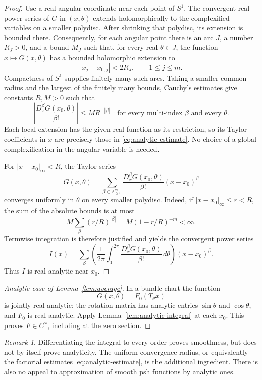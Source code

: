 \documentclass[11pt]{amsart}
\theoremstyle{definition}
\theoremstyle{remark}
\newtheorem{remark}[theorem]{Remark}
\numberwithin{equation}{section}
\begin{document}
\begin{proof}
Use a real angular coordinate near each point of $S^1$. The convergent
real power series of $G$ in $(x,\theta)$ extends holomorphically to
the complexified variables on a smaller polydisc. After shrinking
that polydisc, its extension is bounded there. Consequently, for each
angular point there is an arc $J$, a number $R_J>0$, and a bound $M_J$
such that, for every real $\theta\in J$, the function
$x\mapsto G(x,\theta)$ has a bounded holomorphic extension to
\[
|x_j-x_{0,j}|<2R_J,\qquad 1\le j\le m.
\]
Compactness of $S^1$ supplies finitely many such arcs. Taking a smaller
common radius and the largest of the finitely many bounds, Cauchy's
estimates give constants $R,M>0$ such that
\begin{equation}\label{eq:analytic-estimate}
\left|\frac{D_x^\beta G(x_0,\theta)}{\beta!}\right|
\le M R^{-|\beta|}
\quad\text{for every multi-index $\beta$ and every $\theta$.}
\end{equation}
Each local extension has the given real function as its restriction,
so its Taylor coefficients in $x$ are precisely those in
\eqref{eq:analytic-estimate}. No choice of a global complexification
in the angular variable is needed.

For $|x-x_0|_\infty<R$, the Taylor series
\[
G(x,\theta)=\sum_{\beta\in\mathbb Z_{\ge0}^m}
\frac{D_x^\beta G(x_0,\theta)}{\beta!}(x-x_0)^\beta
\]
converges uniformly in $\theta$ on every smaller polydisc. Indeed,
if $|x-x_0|_\infty\le r<R$, the sum of the absolute bounds is at most
\[
M\sum_\beta(r/R)^{|\beta|}=M(1-r/R)^{-m}<\infty.
\]
Termwise integration is therefore justified and yields the convergent
power series
\[
I(x)=\sum_\beta\left(
\frac1{2\pi}\int_0^{2\pi}
\frac{D_x^\beta G(x_0,\theta)}{\beta!}\,d\theta\right)(x-x_0)^\beta.
\]
Thus $I$ is real analytic near $x_0$.
\end{proof}

\begin{proof}[Analytic case of Lemma~\ref{lem:average}]
In a bundle chart the function
\[
G(x,\theta)=F_0(T_\theta x)
\]
is jointly real analytic: the rotation
matrix has analytic entries $\sin\theta$ and $\cos\theta$, and
$F_0$ is real analytic. Apply Lemma~\ref{lem:analytic-integral} at
each $x_0$. This proves $F\in C^\omega$, including at the zero section.
\end{proof}

\begin{remark}
Differentiating the integral to every order proves smoothness, but
does not by itself prove analyticity. The uniform convergence radius,
or equivalently the factorial estimates \eqref{eq:analytic-estimate},
is the additional ingredient. There is also no appeal to approximation
of smooth psh functions by analytic ones.
\end{remark}
\end{document}
